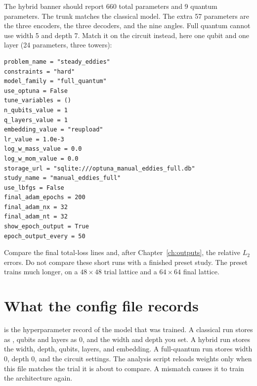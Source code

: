 The hybrid banner should report 660 total parameters and 9 quantum parameters.
The trunk matches the classical model.
The extra 57 parameters are the three encoders, the three decoders, and the nine angles.
Full quantum cannot use width 5 and depth 7.
Match it on the circuit instead, here one qubit and one layer (24 parameters, three towers):

\begin{lstlisting}
problem_name = "steady_eddies"
constraints = "hard"
model_family = "full_quantum"
use_optuna = False
tune_variables = ()
n_qubits_value = 1
q_layers_value = 1
embedding_value = "reupload"
lr_value = 1.0e-3
log_w_mass_value = 0.0
log_w_mom_value = 0.0
storage_url = "sqlite:///optuna_manual_eddies_full.db"
study_name = "manual_eddies_full"
use_lbfgs = False
final_adam_epochs = 200
final_adam_nx = 32
final_adam_nt = 32
show_epoch_output = True
epoch_output_every = 50
\end{lstlisting}

Compare the final total-loss lines and, after Chapter~\ref{ch:outputs}, the relative \(L_{2}\) errors.
Do not compare these short runs with a finished preset study.
The preset trains much longer, on a \(48\times 48\) trial lattice and a \(64\times 64\) final lattice.

\section{What the config file records}

 is the hyperparameter record of the model that was trained.
A classical run stores  as , qubits and layers as 0, and the width and depth you set.
A hybrid run stores the width, depth, qubits, layers, and embedding.
A full-quantum run stores width 0, depth 0, and the circuit settings.
The analysis script reloads weights only when this file matches the trial it is about to compare.
A mismatch causes it to train the architecture again.
